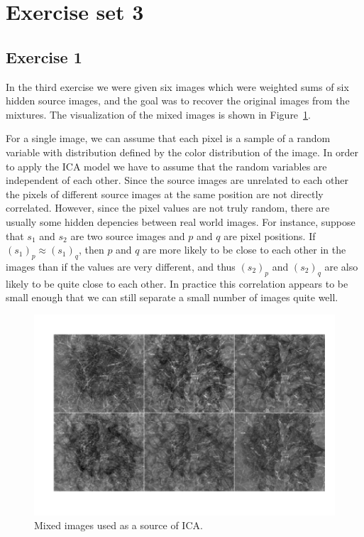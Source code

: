 \documentclass{article}
\begin{document}
\section{Exercise set 3}

\subsection{Exercise 1}

In the third exercise we were given six images which were weighted sums of six hidden source images, and the goal was to recover the original images from the mixtures.
The visualization of the mixed images is shown in Figure~\ref{fig:mixed}.

For a single image, we can assume that each pixel is a sample of a random variable with distribution defined by the color distribution of the image.
In order to apply the ICA model we have to assume that the random variables are independent of each other.
Since the source images are unrelated to each other the pixels of different source images at the same position are not directly correlated.
However, since the pixel values are not truly random, there are usually some hidden depencies between real world images.
For instance, suppose that $s_1$ and $s_2$ are two source images and $p$ and $q$ are pixel positions.
If $(s_1)_p\approx(s_1)_q$, then $p$ and $q$ are more likely to be close to each other in the images than if the values are very different, and thus $(s_2)_p$ and $(s_2)_q$ are also likely to be quite close to each other.
In practice this correlation appears to be small enough that we can still separate a small number of images quite well.

\newcommand\iscale{0.45}
\begin{figure}\centering
	\includegraphics[scale=\iscale]{mixed}
	\caption{Mixed images used as a source of ICA.}\label{fig:mixed}
\end{figure}
\end{document}
